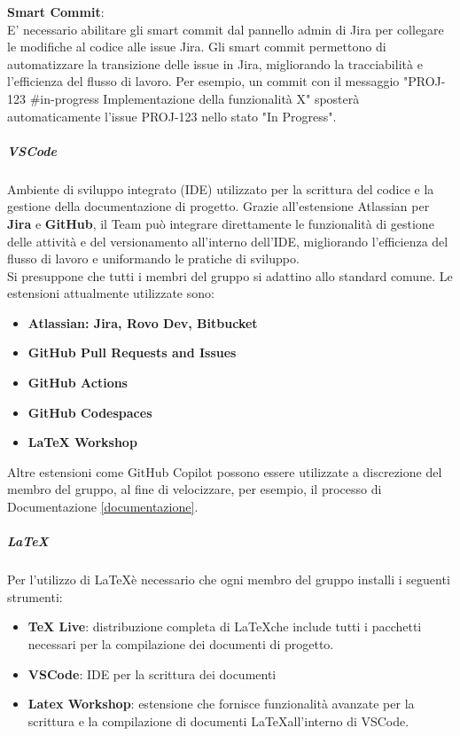 \documentclass[a4paper,12pt]{article}
\begin{document}
\textbf{Smart Commit}:\label{conf_smart_commit}\\
E' necessario abilitare gli smart commit dal pannello admin di Jira per collegare le modifiche al codice alle issue Jira. Gli smart commit permettono di automatizzare la transizione delle issue in Jira, migliorando la tracciabilità e l'efficienza del flusso di lavoro. Per esempio, un commit con il messaggio "PROJ-123 \#in-progress Implementazione della funzionalità X" sposterà automaticamente l'issue PROJ-123 nello stato "In Progress".


\subparagraph{VSCode} \label{conf_vscode}
Ambiente di sviluppo integrato (IDE) utilizzato per la scrittura del codice e
la gestione della documentazione di progetto. Grazie all'estensione Atlassian
per \textbf{Jira} e \textbf{GitHub}, il Team può integrare direttamente le
funzionalità di gestione delle attività e del versionamento all'interno
dell'IDE, migliorando l'efficienza del flusso di lavoro e uniformando le
pratiche di sviluppo. \\ Si presuppone che tutti i membri del gruppo si
adattino allo standard comune. Le estensioni attualmente utilizzate sono:
\begin{itemize}
    \item \textbf{Atlassian: Jira, Rovo Dev, Bitbucket}
    \item \textbf{GitHub Pull Requests and Issues}
    \item \textbf{GitHub Actions}
    \item \textbf{GitHub Codespaces}
    \item \textbf{LaTeX Workshop}
\end{itemize}
Altre estensioni come GitHub Copilot possono essere utilizzate a discrezione del
membro del gruppo, al fine di velocizzare, per esempio, il processo di Documentazione \ref{documentazione}.

\subparagraph{\LaTeX}
Per l'utilizzo di \LaTeX è necessario che ogni membro del gruppo installi i seguenti strumenti:
\begin{itemize}
    \item \textbf{TeX Live}: distribuzione completa di \LaTeX che include tutti i pacchetti necessari per la compilazione dei documenti di progetto.
    \item \textbf{VSCode}: IDE per la scrittura dei documenti
    \item \textbf{Latex Workshop}: estensione che fornisce funzionalità avanzate per la scrittura e la compilazione di documenti \LaTeX all'interno di VSCode.
\end{itemize}
\end{document}
